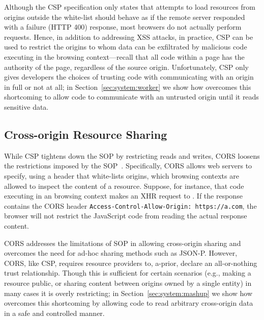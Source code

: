 Although the CSP specification only states that attempts to load
resources from origins outside the white-list should behave as if the
remote server responded with a failure (HTTP 400) response, most
browsers do not actually perform requests.
%
Hence, in addition to addressing XSS attacks, in practice, CSP can
be used to restrict the origins to whom data can be exfiltrated by
malicious code executing in the browsing context---recall that all code
within a page has the authority of the page, regardless of the source
origin.
%
Unfortunately, CSP only gives developers the choices of trusting code
with communicating with an origin in full or not at all;
%
in Section~\ref{sec:system:worker} we show how \sys{} overcomes this
shortcoming to allow code to communicate with an untrusted origin
until it reads sensitive data.


\subsection{Cross-origin Resource Sharing} 
\label{sec:background:cors}

While CSP tightens down the SOP by restricting reads and writes, CORS
loosens the restrictions imposed by the SOP~\cite{rfc6454, VanKesteren2012,
googlehandbook}.
%
Specifically, CORS allows web servers to specify, using a header that
white-lists origins, which browsing contexts are allowed to inspect
the content of a resource.
%
Suppose, for instance, that code executing in an  browsing
context makes an XHR request to .
%
If the response contains the CORS header
\texttt{Access-Control-Allow-Origin: https://a.com}, the browser will
not restrict the JavaScript code from reading the actual response
content.

CORS addresses the limitations of SOP in allowing cross-origin
sharing and overcomes the need for ad-hoc sharing methods such as
JSON-P.
%
However, CORS, like CSP, requires resource providers to, a-prior,
declare an all-or-nothing trust relationship.
%
Though this is sufficient for certain scenarios (e.g., making a
resource public, or sharing content between origins owned by a single
entity) in many cases it is overly restricting;
%
in Section~\ref{sec:system:mashup} we show how \sys{} overcomes this
shortcoming by allowing code to read arbitrary cross-origin
data in a safe and controlled manner.



